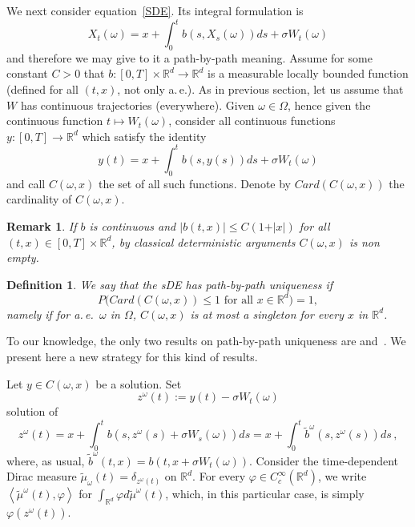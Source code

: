 \documentclass[a4paper,10pt]{article}
\newtheorem{definition}[theorem]{Definition}
\newtheorem{remark}[theorem]{Remark}
\newcommand{\mr}{\mathbb{R}}
\newcommand{\td}{\tilde}
\begin{document}
We next consider equation~\eqref{SDE}. Its integral formulation is 
\[
X_{t}(\omega)  =x+\int_{0}^{t}b(  s,X_{s}(
\omega)  )  ds+\sigma W_{t}(\omega)
\]
and therefore we may give to it a path-by-path meaning. Assume for some
constant $C>0$ that $b \colon [0,T]  \times\mathbb{R}^{d}\rightarrow
\mathbb{R}^{d}$ is a measurable locally bounded function (defined for all
$(t,x)  $, not only a.\,e.). As in previous section, let us
assume that $W$ has continuous trajectories (everywhere). Given $\omega\in\Omega$,
hence given the continuous function $t\mapsto W_{t}(\omega)  $,
consider all continuous functions $y \colon [0,T]  \rightarrow
\mathbb{R}^{d}$ which satisfy the identity 
\[
y(t)  =x+\int_{0}^{t}b(  s,y(s)  )
ds+\sigma W_{t}(\omega)
\]
and call $C(\omega,x)$ the set of all such functions. Denote by
$Card(C(\omega,x))$ the cardinality of $C(\omega,x)$.

\begin{remark}
If $b$ is continuous and $\vert b(  t,x)  \vert \leq
C(  1+\vert x\vert )  $ for all $(  t,x)
\in [0,T]  \times\mathbb{R}^{d}$, by classical deterministic
arguments $C(\omega,x)$ is non empty.
\end{remark}

\begin{definition}
We say that the sDE has \textit{path-by-path uniqueness} if
\begin{equation*}
P\big(  Card(  C(\omega,x) ) \leq 1 \text{ for all } x\in\mr^d \big)  =1,
\end{equation*}
namely if for a.\,e.\ $\omega$ in $\Omega$, $C(\omega,x)$ is at most a singleton for every $x$ in $\mr^d$.
\end{definition}

To our knowledge, the only two results on path-by-path uniqueness are
\cite{DAVIE07} and~\cite{CATGUB13}. We present here a new strategy for this kind of results.

Let $y\in C(  \omega,x)  $ be a solution. Set
\[
z^\omega(t)  :=y(t)  -\sigma W_{t}(
\omega)
\]
solution of
\begin{equation*}
z^\omega(t)  =x+\int_{0}^{t}b(s,z^\omega(s)  +\sigma W_{s}(\omega)  )  ds =x+\int_{0}^{t}\widetilde{b}^\omega(s,z^\omega(s))  ds \,,
\end{equation*}
where, as usual, $\td{b}^\omega(t,x)=b(t,x+\sigma W_t(\omega))$. Consider the time-dependent Dirac measure $\widetilde{\mu}_{\omega
}(t)  =\delta_{z^\omega(t)  }$ on $\mathbb{R}^{d} 
$. For every $\varphi\in C_{c}^{\infty}(\mathbb{R}^{d})$, we write
$\left\langle \widetilde{\mu}^\omega(t)  ,\varphi\right\rangle
$ for $\int_{\mathbb{R}^{d}}\varphi d\widetilde{\mu}^\omega(t)
$, which, in this particular case, is simply $\varphi(z^\omega(t))$.
\end{document}
